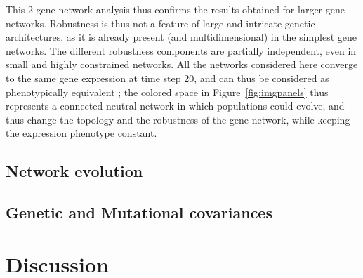 \documentclass{article}
\begin{document}
This 2-gene network analysis thus confirms the results obtained for larger gene networks. Robustness is thus not a feature of large and intricate genetic architectures, as it is already present (and multidimensional) in the simplest gene networks. The different robustness components are partially independent, even in small and highly constrained networks. All the networks considered here converge to the same gene expression at time step 20, and can thus be considered as phenotypically equivalent ; the colored space in Figure~\ref{fig:imgpanels} thus represents a connected neutral network in which populations could evolve, and thus change the topology and the robustness of the gene network, while keeping the expression phenotype constant. 

\subsection{Network evolution}

\subsection{Genetic and Mutational covariances}




\section{Discussion}

\printbibliography




\clearpage
\end{document}
